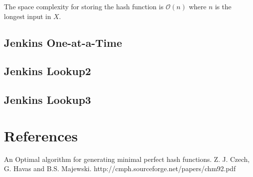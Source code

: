 \documentclass{article}
\newcommand{\OO}{\mathcal{O}}
\begin{document}
The space complexity for storing the hash function is $\OO(n)$ where
$n$ is the longest input in $X$.

\subsection{Jenkins One-at-a-Time}

\subsection{Jenkins Lookup2}

\subsection{Jenkins Lookup3}

\section{References}

An Optimal algorithm for generating minimal perfect hash functions.
Z. J. Czech, G. Havas and B.S. Majewski.
http://cmph.sourceforge.net/papers/chm92.pdf
\end{document}
